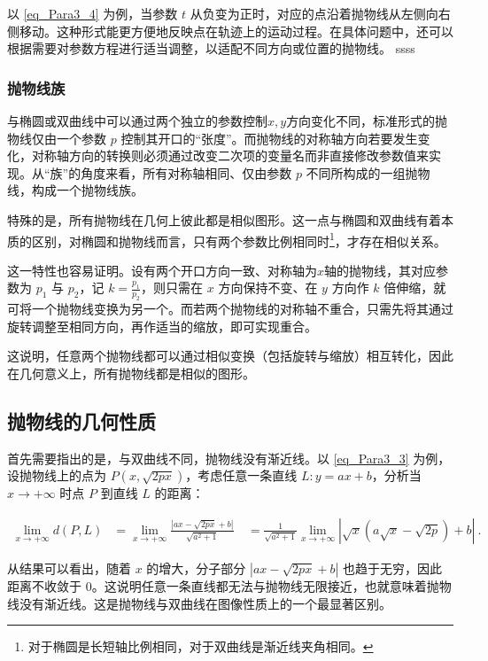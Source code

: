 以 \autoref{eq_Para3_4} 为例，当参数 $t$ 从负变为正时，对应的点沿着抛物线从左侧向右侧移动。这种形式能更方便地反映点在轨迹上的运动过程。在具体问题中，还可以根据需要对参数方程进行适当调整，以适配不同方向或位置的抛物线。
ssss

\subsubsection{抛物线族}

与椭圆或双曲线中可以通过两个独立的参数控制$x,y$方向变化不同，标准形式的抛物线仅由一个参数 $p$ 控制其开口的“张度”。而抛物线的对称轴方向若要发生变化，对称轴方向的转换则必须通过改变二次项的变量名而非直接修改参数值来实现。从“族”的角度来看，所有对称轴相同、仅由参数 $p$ 不同所构成的一组抛物线，构成一个抛物线族。

特殊的是，所有抛物线在几何上彼此都是相似图形。这一点与椭圆和双曲线有着本质的区别，对椭圆和抛物线而言，只有两个参数比例相同时\footnote{对于椭圆是长短轴比例相同，对于双曲线是渐近线夹角相同。}，才存在相似关系。

这一特性也容易证明。设有两个开口方向一致、对称轴为$x$轴的抛物线，其对应参数为 $p_1$ 与 $p_2$，记 $\displaystyle k = \frac{p_1}{p_2}$，则只需在 $x$ 方向保持不变、在 $y$ 方向作 $k$ 倍伸缩，就可将一个抛物线变换为另一个。而若两个抛物线的对称轴不重合，只需先将其通过旋转调整至相同方向，再作适当的缩放，即可实现重合。

这说明，任意两个抛物线都可以通过相似变换（包括旋转与缩放）相互转化，因此在几何意义上，所有抛物线都是相似的图形。

\subsection{抛物线的几何性质}

首先需要指出的是，与双曲线不同，抛物线没有渐近线。以 \autoref{eq_Para3_3} 为例，设抛物线上的点为 $P(x, \sqrt{2px})$，考虑任意一条直线 $L: y = ax + b$，分析当 $x \to +\infty$ 时点 $P$ 到直线 $L$ 的距离：

\begin{equation}
\begin{split}
\lim_{x \to +\infty} d(P, L)
&= \lim_{x \to +\infty} \frac{|ax - \sqrt{2px} + b|}{\sqrt{a^2 + 1}}\
&= \frac{1}{\sqrt{a^2 + 1}} \lim_{x \to +\infty} | \sqrt{x} \left( a\sqrt{x} - \sqrt{2p} \right) + b |~.
\end{split}
\end{equation}

从结果可以看出，随着 $x$ 的增大，分子部分 $|ax - \sqrt{2px} + b|$ 也趋于无穷，因此距离不收敛于 $0$。这说明任意一条直线都无法与抛物线无限接近，也就意味着抛物线没有渐近线。这是抛物线与双曲线在图像性质上的一个最显著区别。


